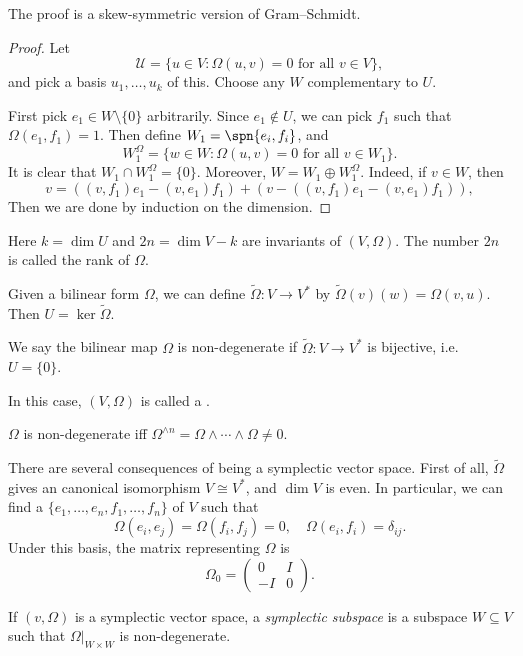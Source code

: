 \documentclass[a4paper]{article}
\begin{document}
The proof is a skew-symmetric version of Gram--Schmidt.
\begin{proof}
  Let
  \[
    \mathcal{U} = \{u \in V : \Omega(u, v) = 0\text{ for all }v \in V\},
  \]
  and pick a basis $u_1, \ldots, u_k$ of this. Choose any $W$ complementary to $U$.

  First pick $e_1 \in W \setminus \{0\}$ arbitrarily. Since $e_1 \not \in U$, we can pick $f_1$ such that $\Omega(e_1, f_1) = 1$. Then define $W_1 = \spn\{e_i, f_i\}$, and
  \[
    W_1^\Omega = \{w \in W: \Omega(u, v) = 0\text{ for all }v \in W_1\}.
  \]
  It is clear that $W_1 \cap W_1^\Omega = \{0\}$. Moreover, $W = W_1 \oplus W_1^\Omega$. Indeed, if $v \in W$, then
  \[
    v = ((v, f_1) e_1 - (v, e_1) f_1) + (v - ((v, f_1) e_1 - (v, e_1) f_1)),
  \]
  Then we are done by induction on the dimension.
\end{proof}
Here $k = \dim U$ and $2n = \dim V - k$ are invariants of $(V, \Omega)$. The number $2n$ is called the rank of $\Omega$.

Given a bilinear form $\Omega$, we can define $\tilde{\Omega}: V \to V^*$ by $\tilde{\Omega}(v)(w) = \Omega(v, u)$. Then $U = \ker \tilde{\Omega}$.

\begin{defi}
  We say the bilinear map $\Omega$ is non-degenerate if $\tilde{\Omega}: V \to V^*$ is bijective, i.e.\ $U = \{0\}$.

  In this case, $(V, \Omega)$ is called a .
\end{defi}

\begin{ex}
  $\Omega$ is non-degenerate iff $\Omega^{\wedge n} = \Omega \wedge \cdots \wedge \Omega \not= 0$.
\end{ex}

There are several consequences of being a symplectic vector space. First of all, $\tilde{\Omega}$ gives an canonical isomorphism $V \cong V^*$, and $\dim V$ is even. In particular, we can find a  $\{e_1, \ldots, e_n, f_1, \ldots, f_n\}$ of $V$ such that
\[
  \Omega(e_i, e_j) = \Omega(f_i, f_j) = 0,\quad \Omega(e_i, f_i) = \delta_{ij}.
\]
Under this basis, the matrix representing $\Omega$ is
\[
  \Omega_0 = \begin{pmatrix}
    0 & I\\
    -I & 0
  \end{pmatrix}.
\]
\begin{defi}
  If $(v, \Omega)$ is a symplectic vector space, a \emph{symplectic subspace} is a subspace $W \subseteq V$ such that $\Omega|_{W \times W}$ is non-degenerate.
\end{defi}
\end{document}
